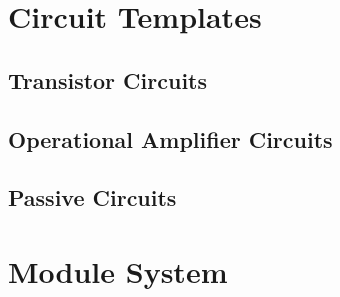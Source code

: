 \documentclass[parskip=half]{scrartcl}
\begin{document}
    \section{Circuit Templates}\label{sec:templates}
    \subsection{Transistor Circuits}
    \subsection{Operational Amplifier Circuits}
    \subsection{Passive Circuits}
    \section{Module System}
\end{document}
